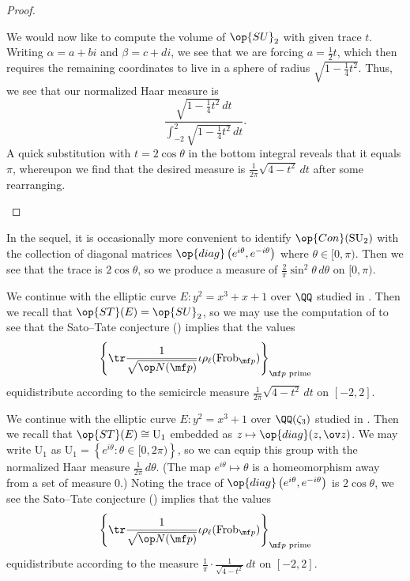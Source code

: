\documentclass[../thesis.tex]{subfiles}
\begin{document}
\begin{proof}
\begin{enumerate}
		We would now like to compute the volume of $\op{SU}_2$ with given trace $t$. Writing $\alpha=a+bi$ and $\beta=c+di$, we see that we are forcing $a=\frac12t$, which then requires the remaining coordinates to live in a sphere of radius $\sqrt{1-\frac14t^2}$. Thus, we see that our normalized Haar measure is
		\[\frac{\sqrt{1-\frac14t^2}\,dt}{\int_{-2}^2\sqrt{1-\frac14t^2}\,dt}.\]
		A quick substitution with $t=2\cos\theta$ in the bottom integral reveals that it equals $\pi$, whereupon we find that the desired measure is $\frac1{2\pi}\sqrt{4-t^2}\,dt$ after some rearranging.
		\qedhere
	\end{enumerate}
\end{proof}
\begin{remark} \label{rem:better-su2-haar-measure}
	In the sequel, it is occasionally more convenient to identify $\op{Con}(\mathrm{SU}_2)$ with the collection of diagonal matrices $\op{diag}\left(e^{i\theta},e^{-i\theta}\right)$ where $\theta\in[0,\pi)$. Then we see that the trace is $2\cos\theta$, so we produce a measure of $\frac2\pi\sin^2\theta\,d\theta$ on $[0,\pi)$.
\end{remark}
\begin{example} \label{ex:ec-no-cm-measure}
	We continue with the elliptic curve $E\colon y^2=x^3+x+1$ over $\QQ$ studied in . Then we recall that $\op{ST}(E)=\op{SU}_2$, so we may use the computation of  to see that the Sato--Tate conjecture () implies that the values
	\[\left\{\tr\frac1{\sqrt{\op N(\mf p)}}\iota\rho_\ell(\mathrm{Frob}_{\mf p})\right\}_{\mf p\text{ prime}}\]
	equidistribute according to the semicircle measure $\frac1{2\pi}\sqrt{4-t^2}\,dt$ on $[-2,2]$.
\end{example}
\begin{example} \label{ex:cm-ec-st-measure}
	We continue with the elliptic curve $E\colon y^2=x^3+1$ over $\QQ(\zeta_3)$ studied in . Then we recall that $\op{ST}(E)\cong\mathrm U_1$ embedded as $z\mapsto\op{diag}(z,\ov z)$. We may write $\mathrm U_1$ as $\mathrm U_1=\left\{e^{i\theta}:\theta\in[0,2\pi)\right\}$, so we can equip this group with the normalized Haar measure $\frac1{2\pi}\,d\theta$. (The map $e^{i\theta}\mapsto\theta$ is a homeomorphism away from a set of measure $0$.) Noting the trace of $\op{diag}\left(e^{i\theta},e^{-i\theta}\right)$ is $2\cos\theta$, we see the Sato--Tate conjecture () implies that the values
	\[\left\{\tr\frac1{\sqrt{\op N(\mf p)}}\iota\rho_\ell(\mathrm{Frob}_{\mf p})\right\}_{\mf p\text{ prime}}\]
	equidistribute according to the measure $\frac1\pi\cdot\frac1{\sqrt{4-t^2}}\,dt$ on $[-2,2]$.
\end{example}
\end{document}
